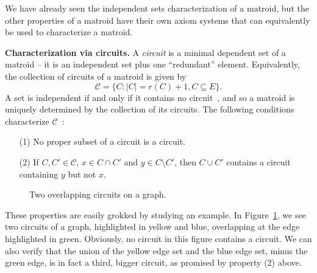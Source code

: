 We have already seen the independent sets characterization of a matroid, but the other properties of a matroid have their own axiom systems that can equivalently be used to characterize a matroid.

\textbf{Characterization via circuits.} A \textit{circuit} is a minimal dependent set of a matroid -- it is an independent set plus one ``redundant'' element. Equivalently, the collection of circuits of a matroid is given by
$$\mathcal{C} = \bigl\{ C : |C| = r(C) + 1, C\subseteq E \bigr\}.$$
A set is independent if and only if it contains no circuit~\cite{schrijver-2003}, and so a matroid is uniquely determined by the collection of its circuits. The following conditions characterize $\mathcal{C}$~\cite{whitney-1935}:
\begin{enumerate}
  \item[(1)] No proper subset of a circuit is a circuit.
  \item[(2)] If $C, C'\in\mathcal{C}$, $x\in C\cap C'$ and $y\in C\setminus C'$, then $C\cup C'$ contains a circuit containing $y$ but not $x$.
\end{enumerate}

\begin{figure}
  \centering
  \caption{Two overlapping circuits on a graph.}
  \label{fig:ex-graph-circuits}
\end{figure}

These properties are easily grokked by studying an example. In Figure~\ref{fig:ex-graph-circuits}, we see two circuits of a graph, highlighted in yellow and blue, overlapping at the edge highlighted in green. Obviously, no circuit in this figure contains a circuit. We can also verify that the union of the yellow edge set and the blue edge set, minus the green edge, is in fact a third, bigger circuit, as promised by property (2) above.

